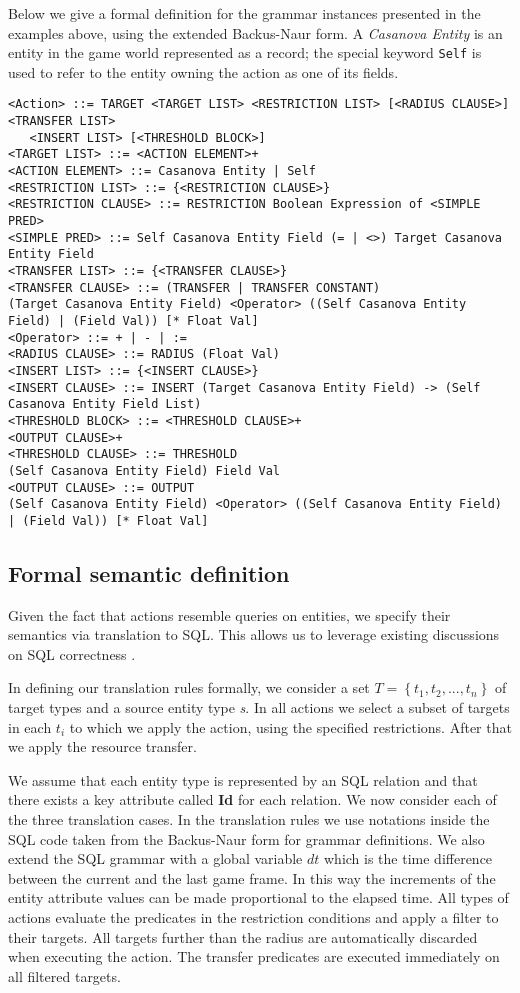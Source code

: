 Below we give a formal definition for the grammar instances presented in
the examples above, using the extended Backus-Naur form. A \emph{Casanova Entity} is an entity in the game
world represented as a record; the special keyword
\texttt{Self} is used to refer to the entity owning the action as one of
its fields.

\begin{lstlisting}
<Action> ::= TARGET <TARGET LIST> <RESTRICTION LIST> [<RADIUS CLAUSE>] <TRANSFER LIST>
   <INSERT LIST> [<THRESHOLD BLOCK>]
<TARGET LIST> ::= <ACTION ELEMENT>+
<ACTION ELEMENT> ::= Casanova Entity | Self
<RESTRICTION LIST> ::= {<RESTRICTION CLAUSE>}
<RESTRICTION CLAUSE> ::= RESTRICTION Boolean Expression of <SIMPLE PRED>
<SIMPLE PRED> ::= Self Casanova Entity Field (= | <>) Target Casanova Entity Field
<TRANSFER LIST> ::= {<TRANSFER CLAUSE>}
<TRANSFER CLAUSE> ::= (TRANSFER | TRANSFER CONSTANT)
(Target Casanova Entity Field) <Operator> ((Self Casanova Entity Field) | (Field Val)) [* Float Val]
<Operator> ::= + | - | :=
<RADIUS CLAUSE> ::= RADIUS (Float Val)
<INSERT LIST> ::= {<INSERT CLAUSE>}
<INSERT CLAUSE> ::= INSERT (Target Casanova Entity Field) -> (Self Casanova Entity Field List)
<THRESHOLD BLOCK> ::= <THRESHOLD CLAUSE>+
<OUTPUT CLAUSE>+
<THRESHOLD CLAUSE> ::= THRESHOLD
(Self Casanova Entity Field) Field Val
<OUTPUT CLAUSE> ::= OUTPUT
(Self Casanova Entity Field) <Operator> ((Self Casanova Entity Field) | (Field Val)) [* Float Val]
\end{lstlisting}

\subsection{Formal semantic definition}

Given the fact that actions resemble queries on entities, we specify
their semantics via translation to SQL. This allows us to
leverage existing discussions on SQL correctness \citep{SQLsemantic}.

In defining our translation rules formally, we consider a set $T =
\left\lbrace t_{1},t_{2},...,t_{n} \right\rbrace $ of target types and
a source entity type \textit{s}. In all actions we select a subset of
targets in each $t_{i}$ to which we apply the action, using
the specified restrictions. After that we apply the resource transfer.

We assume that each entity type is represented by an SQL relation and
that there exists a key attribute called \textbf{Id} for each
relation. We now consider each of the three translation cases.
In the translation rules we use notations inside the SQL code
taken from the Backus-Naur form for grammar definitions. We also extend the SQL grammar with a global
variable $dt$ which is the time difference between the current and the
last game frame. In this way the increments of the entity attribute
values can be made proportional to the elapsed time. All types of actions
evaluate the predicates in the restriction conditions and apply a
filter to their targets. All targets further than the radius
are automatically discarded when executing the action. The transfer
predicates are executed immediately on all filtered targets.

